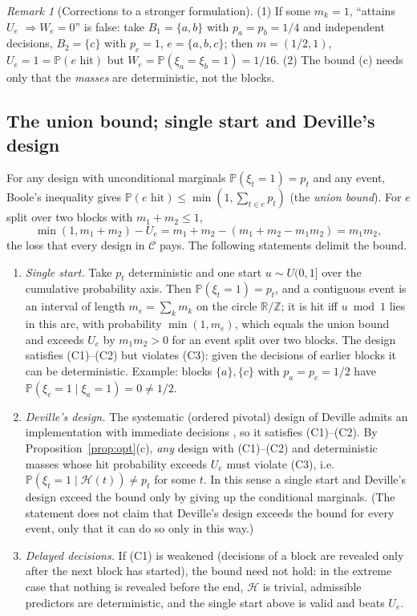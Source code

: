 \documentclass[11pt]{article}
\theoremstyle{remark}
\newtheorem{remark}{Remark}
\renewcommand{\Pr}{\mathbb{P}}
\newcommand{\Hk}{\mathcal H}
\begin{document}
\begin{remark}[Corrections to a stronger formulation]
(1) If some $m_k=1$, ``attains $U_e$ $\Rightarrow W_e=0$'' is false: take $B_1=\{a,b\}$ with $p_a=p_b=1/4$ and independent decisions, $B_2=\{c\}$ with $p_c=1$, $e=\{a,b,c\}$; then $m=(1/2,1)$, $U_e=1=\Pr(e\text{ hit})$ but $W_e=\Pr(\xi_a=\xi_b=1)=1/16$. (2) The bound (c) needs only that the \emph{masses} are deterministic, not the blocks.
\end{remark}

\subsection*{The union bound; single start and Deville's design}
For any design with unconditional marginals $\Pr(\xi_t=1)=p_t$ and any event, Boole's inequality gives $\Pr(e\text{ hit})\le\min(1,\sum_{t\in e}p_t)$ (the \emph{union bound}). For $e$ split over two blocks with $m_1+m_2\le1$,
\[
\min(1,m_1+m_2)-U_e=m_1+m_2-(m_1+m_2-m_1m_2)=m_1m_2 ,
\]
the loss that every design in $\mathcal C$ pays. The following statements delimit the bound.

\begin{enumerate}[label=(\alph*)]
\item \emph{Single start.} Take $p_t$ deterministic and one start $u\sim U(0,1]$ over the cumulative probability axis. Then $\Pr(\xi_t=1)=p_t$, and a contiguous event is an interval of length $m_e=\sum_km_k$ on the circle $\mathbb R/\mathbb Z$; it is hit iff $u \bmod 1$ lies in this arc, with probability $\min(1,m_e)$, which equals the union bound and exceeds $U_e$ by $m_1m_2>0$ for an event split over two blocks. The design satisfies (C1)--(C2) but violates (C3): given the decisions of earlier blocks it can be deterministic. Example: blocks $\{a\},\{c\}$ with $p_a=p_c=1/2$ have $\Pr(\xi_c=1\mid\xi_a=1)=0\ne1/2$.
\item \emph{Deville's design.} The systematic (ordered pivotal) design of Deville admits an implementation with immediate decisions \cite{panahbehagh2024}, so it satisfies (C1)--(C2). By Proposition~\ref{prop:opt}(c), \emph{any} design with (C1)--(C2) and deterministic masses whose hit probability exceeds $U_e$ must violate (C3), i.e.\ $\Pr(\xi_t=1\mid\Hk(t))\ne p_t$ for some $t$. In this sense a single start and Deville's design exceed the bound only by giving up the conditional marginals. (The statement does not claim that Deville's design exceeds the bound for every event, only that it can do so only in this way.)
\item \emph{Delayed decisions.} If (C1) is weakened (decisions of a block are revealed only after the next block has started), the bound need not hold: in the extreme case that nothing is revealed before the end, $\Hk$ is trivial, admissible predictors are deterministic, and the single start above is valid and beats $U_e$.
\end{enumerate}
\end{document}
